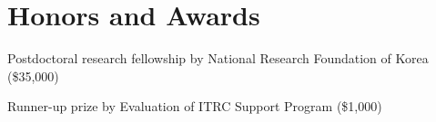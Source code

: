 \section*{Honors and Awards}
\begin{description}
\item Postdoctoral research fellowship by
  National Research Foundation of Korea (\$35,000) 

\item Runner-up prize by
  Evaluation of ITRC Support Program (\$1,000) 

\end{description}
